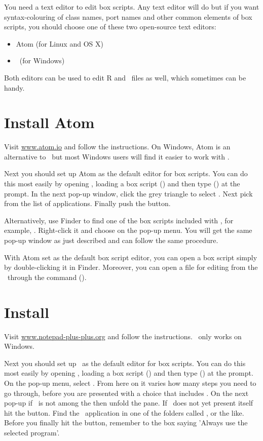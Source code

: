 You need a text editor to edit box scripts. Any text editor will do but if you want syntax-colouring of class names, port names and other common elements of box scripts, you should choose one of these two open-source text editors:
\begin{itemize}
\item Atom (for Linux and OS X)
\item \NPP\ (for Windows)
\end{itemize}
Both editors can be used to edit R and \CPP\ files as well, which sometimes can be handy.

\section{Install Atom}
Visit \url{www.atom.io} and follow the instructions. On Windows, Atom is an alternative to \NPP\ but most Windows users will find it easier to work with \NPP.

Next you should set up Atom as the default editor for box scripts. You can do this most easily by opening \US, loading a box script () and then type  () at the prompt. In the next pop-up window, click the grey triangle to select . Next pick  from the list of applications. Finally push the  button.

Alternatively, use Finder to find one of the box scripts included with \US, for example, . Right-click it and  choose  on the pop-up menu. You will get the same pop-up window as just described and can follow the same procedure.

With Atom set as the default box script editor, you can open a box script simply by double-clicking it in Finder. Moreover, you can open a file for editing from the \US\ through the  command ().

\section{Install \protect\NPP}
Visit \url{www.notepad-plus-plus.org} and follow the instructions. \NPP\ only works on Windows.

Next you should set up \NPP\ as the default editor for box scripts. You can do this most easily by opening \US, loading a box script () and then type  () at the prompt. On the pop-up menu, select . From here on it varies how many steps you need to go through, before you are presented with a choice that includes \NPP. On the next pop-up if \NPP\ is not among the  then unfold the  pane. If \NPP\ does not yet present itself hit the  button. Find the \NPP\ application in one of the folders called ,  or the like. Before you finally hit the  button, remember to  the box saying 'Always use the selected program'.

